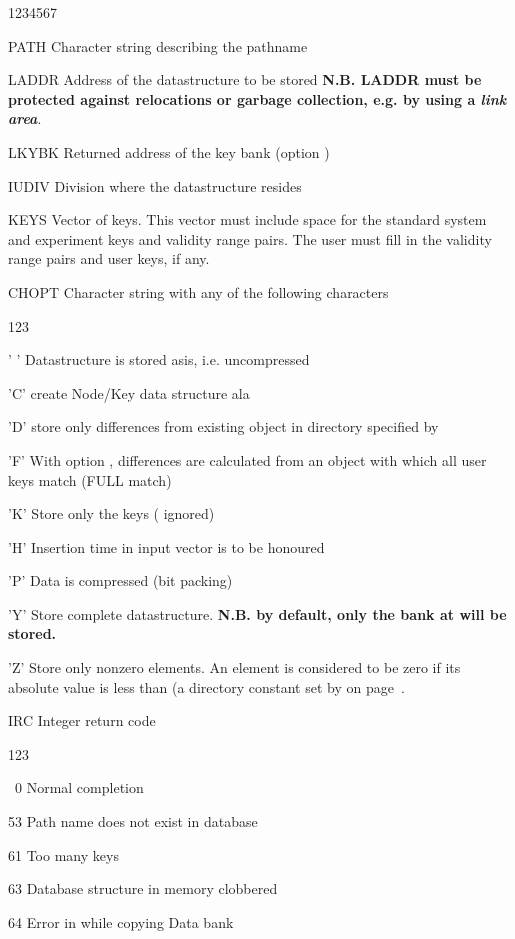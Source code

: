 
\begin{DLtt}{1234567}
\item[PATH]Character string describing the pathname
\item[LADDR]Address of the datastructure to be stored
  {\bf N.B. LADDR must be protected against relocations or garbage
collection, e.g. by using a {\it link area}}.
\item[LKYBK]Returned address of the key bank (option )
\item[IUDIV]Division where the datastructure resides
\item[KEYS]Vector of keys. This vector must include space for the standard
system and experiment keys and validity range pairs. The user must
fill in the validity range pairs and user keys, if any.
\item[CHOPT]Character string with any of the following characters
  \begin{DLtt}{123}
    \item[' ']Datastructure is stored asis, i.e. uncompressed
    \item['C']create Node/Key data structure ala 
    \item['D']store only differences from existing object in directory
      specified by 
    \item['F']With option , differences are calculated from an
    object with which all user keys match (FULL match)
    \item['K']Store only the keys ( ignored)
    \item['H']Insertion time in input  vector is to be honoured
    \item['P']Data is compressed (bit packing)
    \item['Y']Store complete datastructure. {\bf N.B. by default, only
              the bank at  will be stored.}
    \item['Z']Store only nonzero elements. An element is considered to
      be zero if its absolute value is less than  (a directory
      constant set by  on page~\pageref{CDMDIR}.
  \end{DLtt}
\item[IRC]Integer return code
    \begin{DLtt}{123}
    \item[\ 0]Normal completion
    \item[53]Path name does not exist in database
    \item[61]Too many keys
    \item[63]Database structure in memory clobbered
    \item[64]Error in  while copying Data bank
    \end{DLtt}
\end{DLtt}

